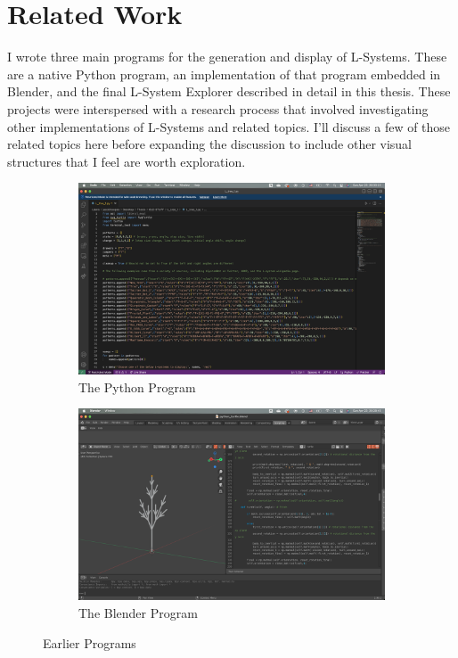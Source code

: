 \documentclass[12pt,twoside]{reedthesis}
\begin{document}
\section{Related Work}
	I wrote three main programs for the generation and display of L-Systems. These are a native Python program, an implementation of that program embedded in Blender, and the final L-System Explorer described in detail in this thesis. These projects were interspersed with a research process that involved investigating other implementations of L-Systems and related topics. I'll discuss a few of those related topics here before expanding the discussion to include other visual structures that I feel are worth exploration.
	
	
	\begin{figure}[h]
	\centering
	\begin{subfigure}{0.475\linewidth}
		\centering
		\includegraphics[width=\linewidth]{Images/PythonImage}
		\caption{The Python Program}
		\label {PythonProgram}
	\end{subfigure}%
	\hfill
	\begin{subfigure}{0.475\linewidth}
		\centering
		\includegraphics[width=\linewidth]{Images/BlenderImage}
		\caption{The Blender Program}
		\label {BlenderProgram}
	\end{subfigure}
	\caption{Earlier Programs}
	\label{EarlierPrograms}
	\end{figure}
\end{document}

